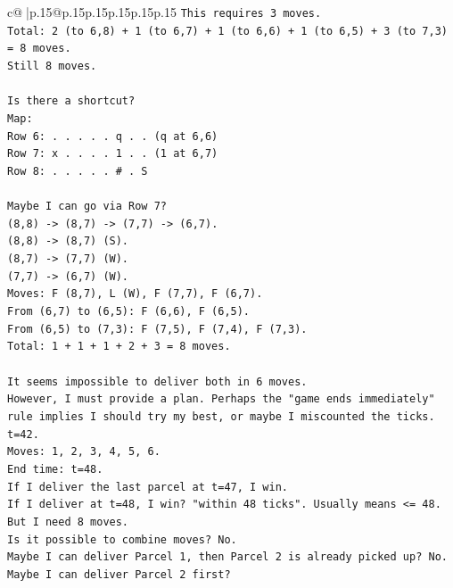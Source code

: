 \documentclass{article}
\begin{document}
{\begin{supertabular}{c@{$\;$}|p{.15\linewidth}@{}p{.15\linewidth}p{.15\linewidth}p{.15\linewidth}p{.15\linewidth}p{.15\linewidth}}
{{{\texttt{This requires 3 moves.} \\
\texttt{Total: 2 (to 6,8) + 1 (to 6,7) + 1 (to 6,6) + 1 (to 6,5) + 3 (to 7,3) = 8 moves.} \\
\texttt{Still 8 moves.} \\
\\ 
\texttt{Is there a shortcut?} \\
\texttt{Map:} \\
\texttt{Row 6: . . . . . q . . (q at 6,6)} \\
\texttt{Row 7: x . . . . 1 . . (1 at 6,7)} \\
\texttt{Row 8: . . . . . \# . S} \\
\\ 
\texttt{Maybe I can go via Row 7?} \\
\texttt{(8,8) {-}> (8,7) {-}> (7,7) {-}> (6,7).} \\
\texttt{(8,8) {-}> (8,7) (S).} \\
\texttt{(8,7) {-}> (7,7) (W).} \\
\texttt{(7,7) {-}> (6,7) (W).} \\
\texttt{Moves: F (8,7), L (W), F (7,7), F (6,7).} \\
\texttt{From (6,7) to (6,5): F (6,6), F (6,5).} \\
\texttt{From (6,5) to (7,3): F (7,5), F (7,4), F (7,3).} \\
\texttt{Total: 1 + 1 + 1 + 2 + 3 = 8 moves.} \\
\\ 
\texttt{It seems impossible to deliver both in 6 moves.} \\
\texttt{However, I must provide a plan. Perhaps the "game ends immediately" rule implies I should try my best, or maybe I miscounted the ticks.} \\
\texttt{t=42.} \\
\texttt{Moves: 1, 2, 3, 4, 5, 6.} \\
\texttt{End time: t=48.} \\
\texttt{If I deliver the last parcel at t=47, I win.} \\
\texttt{If I deliver at t=48, I win? "within 48 ticks". Usually means <= 48.} \\
\texttt{But I need 8 moves.} \\
\texttt{Is it possible to combine moves? No.} \\
\texttt{Maybe I can deliver Parcel 1, then Parcel 2 is already picked up? No.} \\
\texttt{Maybe I can deliver Parcel 2 first?} \\
}}}
\end{supertabular}}
\end{document}
